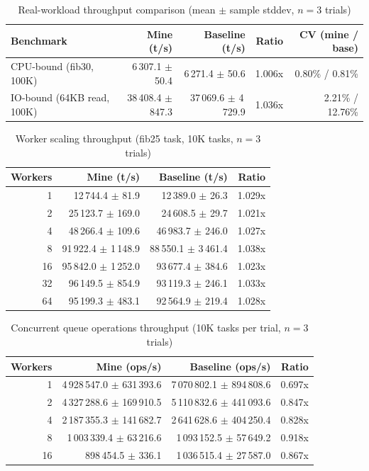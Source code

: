 \begin{table}[htbp]
\centering
\caption{Real-workload throughput comparison (mean $\pm$ sample stddev, $n=3$ trials)}
\label{tab:real_workload}
\begin{tabular}{lrrrr}
\toprule
Benchmark & Mine (t/s) & Baseline (t/s) & Ratio & CV (mine / base) \\
\midrule
CPU-bound (fib30, 100K) & 6\,307.1 $\pm$ 50.4 & 6\,271.4 $\pm$ 50.6 & 1.006x & 0.80\% / 0.81\% \\
IO-bound (64KB read, 100K) & 38\,408.4 $\pm$ 847.3 & 37\,069.6 $\pm$ 4\,729.9 & 1.036x & 2.21\% / 12.76\% \\
\bottomrule
\end{tabular}
\end{table}

\begin{table}[htbp]
\centering
\caption{Worker scaling throughput (fib25 task, 10K tasks, $n=3$ trials)}
\label{tab:scaling}
\begin{tabular}{rrrr}
\toprule
Workers & Mine (t/s) & Baseline (t/s) & Ratio \\
\midrule
1 & 12\,744.4 $\pm$ 81.9 & 12\,389.0 $\pm$ 26.3 & 1.029x \\
2 & 25\,123.7 $\pm$ 169.0 & 24\,608.5 $\pm$ 29.7 & 1.021x \\
4 & 48\,266.4 $\pm$ 109.6 & 46\,983.7 $\pm$ 246.0 & 1.027x \\
8 & 91\,922.4 $\pm$ 1\,148.9 & 88\,550.1 $\pm$ 3\,461.4 & 1.038x \\
16 & 95\,842.0 $\pm$ 1\,252.0 & 93\,677.4 $\pm$ 384.6 & 1.023x \\
32 & 96\,149.5 $\pm$ 854.9 & 93\,119.3 $\pm$ 246.1 & 1.033x \\
64 & 95\,199.3 $\pm$ 483.1 & 92\,564.9 $\pm$ 219.4 & 1.028x \\
\bottomrule
\end{tabular}
\end{table}

\begin{table}[htbp]
\centering
\caption{Concurrent queue operations throughput (10K tasks per trial, $n=3$ trials)}
\label{tab:queue_ops}
\begin{tabular}{rrrr}
\toprule
Workers & Mine (ops/s) & Baseline (ops/s) & Ratio \\
\midrule
1 & 4\,928\,547.0 $\pm$ 631\,393.6 & 7\,070\,802.1 $\pm$ 894\,808.6 & 0.697x \\
2 & 4\,327\,288.6 $\pm$ 169\,910.5 & 5\,110\,832.6 $\pm$ 441\,093.6 & 0.847x \\
4 & 2\,187\,355.3 $\pm$ 141\,682.7 & 2\,641\,628.6 $\pm$ 404\,250.4 & 0.828x \\
8 & 1\,003\,339.4 $\pm$ 63\,216.6 & 1\,093\,152.5 $\pm$ 57\,649.2 & 0.918x \\
16 & 898\,454.5 $\pm$ 336.1 & 1\,036\,515.4 $\pm$ 27\,587.0 & 0.867x \\
\bottomrule
\end{tabular}
\end{table}

